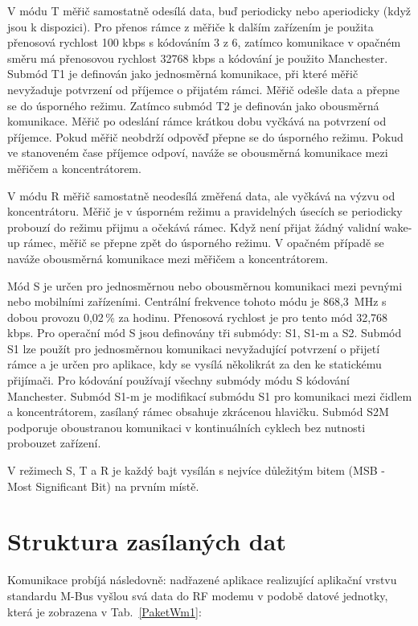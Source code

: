 V	módu T měřič samostatně odesílá data, buď periodicky nebo aperiodicky (když jsou k dispozici). Pro přenos rámce z měřiče k dalším zařízením je použita přenosová rychlost 100 kbps s kódováním 3 z 6, zatímco komunikace v opačném směru má přenosovou rychlost 32768 kbps a kódování je použito Manchester. Submód T1 je definován jako jednosměrná komunikace, při které měřič nevyžaduje potvrzení od příjemce o přijatém rámci. Měřič odešle data a přepne se do úsporného režimu. Zatímco submód T2 je definován jako obousměrná komunikace. Měřič po odeslání rámce krátkou dobu vyčkává na potvrzení od příjemce. Pokud měřič neobdrží odpověď přepne se do úsporného režimu. Pokud ve stanoveném čase příjemce odpoví, naváže se obousměrná komunikace mezi měřičem a koncentrátorem.


V	módu R měřič samostatně neodesílá změřená data, ale vyčkává na výzvu od koncentrátoru. Měřič je v úsporném režimu a pravidelných úsecích se periodicky probouzí do režimu přijmu a očekává rámec. Když není přijat žádný validní wake-up rámec, měřič se přepne zpět do úsporného režimu. V	opačném případě se naváže obousměrná komunikace mezi měřičem a koncentrátorem.


Mód S je určen pro jednosměrnou nebo obousměrnou komunikaci mezi pevnými nebo mobilními zařízeními. Centrální frekvence tohoto módu je 868,3\, MHz s dobou provozu 0,02\,\% za hodinu. Přenosová rychlost je pro tento mód 32,768\,kbps. Pro operační mód S jsou definovány tři submódy: S1, S1-m a S2. Submód S1 lze použít pro jednosměrnou komunikaci nevyžadující potvrzení o přijetí rámce a je určen pro aplikace, kdy se vysílá několikrát za den ke statickému přijímači. Pro kódování používají všechny submódy módu S kódování Manchester.  
Submód S1-m je modifikací submódu S1 pro komunikaci mezi čidlem a koncentrátorem, zasílaný rámec obsahuje zkrácenou hlavičku.
Submód S2M podporuje oboustranou komunikaci v kontinuálních cyklech bez nutnosti probouzet zařízení.

V režimech S, T a R je každý bajt vysílán s nejvíce důležitým bitem (MSB - Most
Significant Bit) na prvním místě.



\section{Struktura zasílaných dat}
Komunikace probíjá následovně: nadřazené aplikace realizující aplikační vrstvu standardu M-Bus vyšlou svá data do RF modemu v podobě datové jednotky, která je zobrazena v Tab.~\ref{PaketWm1}:


